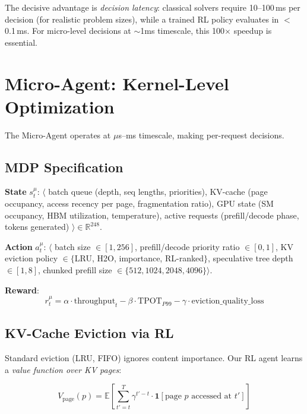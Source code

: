 \documentclass[conference,10pt]{IEEEtran}
\begin{document}
The decisive advantage is \emph{decision latency}: classical solvers require 10--100\,ms per decision (for realistic problem sizes), while a trained RL policy evaluates in $<$0.1\,ms. For micro-level decisions at $\sim$1ms timescale, this 100$\times$ speedup is essential.

\section{Micro-Agent: Kernel-Level Optimization}
\label{sec:micro}

The Micro-Agent operates at $\mu$s--ms timescale, making per-request decisions.

\subsection{MDP Specification}

\textbf{State} $s^{\mu}_t$: $\langle$ batch queue (depth, seq lengths, priorities), KV-cache (page occupancy, access recency per page, fragmentation ratio), GPU state (SM occupancy, HBM utilization, temperature), active requests (prefill/decode phase, tokens generated) $\rangle \in \mathbb{R}^{248}$.

\textbf{Action} $a^{\mu}_t$: $\langle$ batch size $\in [1,256]$, prefill/decode priority ratio $\in [0,1]$, KV eviction policy $\in \{$LRU, H2O, importance, RL-ranked$\}$, speculative tree depth $\in [1,8]$, chunked prefill size $\in \{512, 1024, 2048, 4096\} \rangle$.

\textbf{Reward}: 
\begin{equation}
r^{\mu}_t = \alpha \cdot \text{throughput}_t - \beta \cdot \text{TPOT}_{P99} - \gamma \cdot \text{eviction\_quality\_loss}
\end{equation}

\subsection{KV-Cache Eviction via RL}

Standard eviction (LRU, FIFO) ignores content importance. Our RL agent learns a \emph{value function over KV pages}:

\begin{equation}
V_{\text{page}}(p) = \mathbb{E}\left[\sum_{t'=t}^{T} \gamma^{t'-t} \cdot \mathbf{1}[\text{page } p \text{ accessed at } t']\right]
\end{equation}
\end{document}
